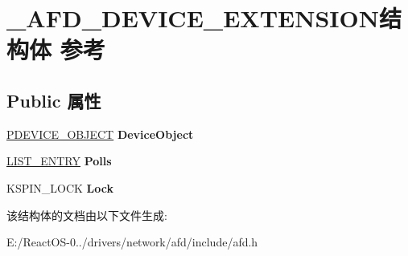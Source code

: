 \hypertarget{struct___a_f_d___d_e_v_i_c_e___e_x_t_e_n_s_i_o_n}{}\section{\+\_\+\+A\+F\+D\+\_\+\+D\+E\+V\+I\+C\+E\+\_\+\+E\+X\+T\+E\+N\+S\+I\+O\+N结构体 参考}
\label{struct___a_f_d___d_e_v_i_c_e___e_x_t_e_n_s_i_o_n}
\subsection*{Public 属性}
\begin{DoxyCompactItemize}
\item 
\mbox{\label{struct___a_f_d___d_e_v_i_c_e___e_x_t_e_n_s_i_o_n_a220e2a24c9009569ca7d3d25f405775f}} 
\hyperlink{struct___d_e_v_i_c_e___o_b_j_e_c_t}{P\+D\+E\+V\+I\+C\+E\+\_\+\+O\+B\+J\+E\+CT} {\bfseries Device\+Object}
\item 
\mbox{\label{struct___a_f_d___d_e_v_i_c_e___e_x_t_e_n_s_i_o_n_a23e1570b2125670f360a86eee1bb73a7}} 
\hyperlink{struct___l_i_s_t___e_n_t_r_y}{L\+I\+S\+T\+\_\+\+E\+N\+T\+RY} {\bfseries Polls}
\item 
\mbox{\label{struct___a_f_d___d_e_v_i_c_e___e_x_t_e_n_s_i_o_n_a75e7c0df6eedd1793611e4858dddf958}} 
K\+S\+P\+I\+N\+\_\+\+L\+O\+CK {\bfseries Lock}
\end{DoxyCompactItemize}


该结构体的文档由以下文件生成\+:\begin{DoxyCompactItemize}
\item 
E\+:/\+React\+O\+S-\/0../drivers/network/afd/include/afd.\+h\end{DoxyCompactItemize}
